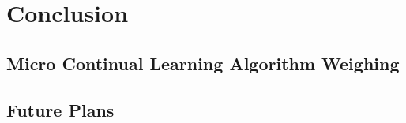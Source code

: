 \chapter{Conclusion}

\section{Micro Continual Learning Algorithm Weighing}

\section{Future Plans}


